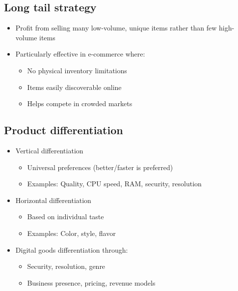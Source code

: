 \subsection{Long tail strategy}

\begin{itemize}
    \item Profit from selling many low-volume, unique items rather than few high-volume items
    \item Particularly effective in e-commerce where:
          \begin{itemize}
              \item No physical inventory limitations
              \item Items easily discoverable online
              \item Helps compete in crowded markets
          \end{itemize}
\end{itemize}

\subsection{Product differentiation}

\begin{itemize}
    \item Vertical differentiation
          \begin{itemize}
              \item Universal preferences (better/faster is preferred)
              \item Examples: Quality, CPU speed, RAM, security, resolution
          \end{itemize}
    \item Horizontal differentiation
          \begin{itemize}
              \item Based on individual taste
              \item Examples: Color, style, flavor
          \end{itemize}
    \item Digital goods differentiation through:
          \begin{itemize}
              \item Security, resolution, genre
              \item Business presence, pricing, revenue models
          \end{itemize}
\end{itemize}

